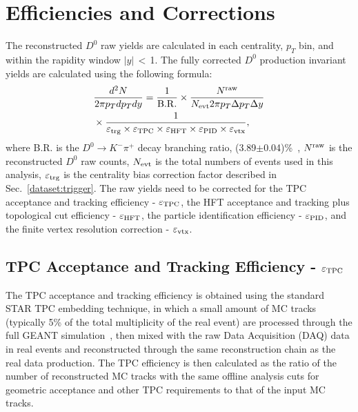 \documentclass[%
 reprint,	
 amsmath,amssymb,
 aps,
 prc,
]{revtex4-1}
\begin{document}
\section{Efficiencies and Corrections}
\label{correction}

The reconstructed $D^0$ raw yields are calculated in each centrality, $p_{T}$ bin, and within the rapidity window $|y|$\,$<$\,1. The fully corrected $D^0$ production invariant yields are calculated using the following formula:
\begin{equation}
  \begin{aligned}
& \frac{d^2N}{2\pi p_{T}dp_{T}dy} = \frac{1}{\rm B.R.} \times \frac{N^{\rm raw}}{N_{\rm evt} 2\pi p_{T}\Delta p_{T}\Delta y} \\
& \times \frac{1}{\varepsilon_{\rm trg}\times\varepsilon_{\rm TPC}\times\varepsilon_{\rm HFT}\times\varepsilon_{\rm PID}\times\varepsilon_{\rm vtx}},
  \end{aligned}
\label{equ:invariantyield}
\end{equation}
where B.R. is the $D^0\rightarrow K^-\pi^+$ decay branching ratio, (3.89$\pm$0.04)\%~\cite{pdg}, $N^{\rm raw}$ is the reconstructed $D^0$ raw counts, $N_{\rm evt}$ is the total numbers of events used in this analysis, $\varepsilon_{\rm trg}$ is the centrality bias correction factor described in Sec.~\ref{dataset:trigger}. The raw yields need to be corrected for the TPC acceptance and tracking efficiency - $\varepsilon_{\rm TPC}$, the HFT acceptance and tracking plus topological cut efficiency - $\varepsilon_{\rm HFT}$, the particle identification efficiency - $\varepsilon_{\rm PID}$, and the finite vertex resolution correction - $\varepsilon_{\rm vtx}$.

\subsection{TPC Acceptance and Tracking Efficiency - $\varepsilon_{\rm TPC}$}
\label{correction:tpc}

The TPC acceptance and tracking efficiency is obtained using the standard STAR TPC embedding technique, in which a small amount of MC tracks (typically 5\% of the total multiplicity of the real event) are processed through the full GEANT simulation~\cite{GEANT3}, then mixed with the raw Data Acquisition (DAQ) data in real events and reconstructed through the same reconstruction chain as the real data production. The TPC efficiency is then calculated as the ratio of the number of reconstructed MC tracks with the same offline analysis cuts for geometric acceptance and other TPC requirements to that of the input MC tracks.
\end{document}

